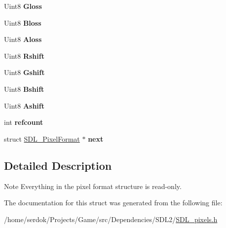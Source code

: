 \begin{DoxyCompactItemize}
Uint8 {\bfseries Gloss}
\item 
\mbox{\label{structSDL__PixelFormat_a337072c1bc8b41efdd2da4e95b8c2ff7}} 
Uint8 {\bfseries Bloss}
\item 
\mbox{\label{structSDL__PixelFormat_a660e95097874088292f1289a458efaa2}} 
Uint8 {\bfseries Aloss}
\item 
\mbox{\label{structSDL__PixelFormat_abfdec7b9ee2ee39db630f4022e4e0daa}} 
Uint8 {\bfseries Rshift}
\item 
\mbox{\label{structSDL__PixelFormat_a6045012f994c02a86bdc4a91b28d2a3c}} 
Uint8 {\bfseries Gshift}
\item 
\mbox{\label{structSDL__PixelFormat_a4212574b67529628d8822ed4eb109754}} 
Uint8 {\bfseries Bshift}
\item 
\mbox{\label{structSDL__PixelFormat_ac3c4ffa0de1f2c94040340deede3bf46}} 
Uint8 {\bfseries Ashift}
\item 
\mbox{\label{structSDL__PixelFormat_a23be8060443d58064a720a4e2ef31729}} 
int {\bfseries refcount}
\item 
\mbox{\label{structSDL__PixelFormat_a1953b66c817116bf81bae4873ee6bce5}} 
struct \hyperlink{structSDL__PixelFormat}{S\+D\+L\+\_\+\+Pixel\+Format} $\ast$ {\bfseries next}
\end{DoxyCompactItemize}


\subsection{Detailed Description}
\begin{DoxyNote}{Note}
Everything in the pixel format structure is read-\/only. 
\end{DoxyNote}


The documentation for this struct was generated from the following file\+:\begin{DoxyCompactItemize}
\item 
/home/serdok/\+Projects/\+Game/src/\+Dependencies/\+S\+D\+L2/\hyperlink{SDL__pixels_8h}{S\+D\+L\+\_\+pixels.\+h}\end{DoxyCompactItemize}
